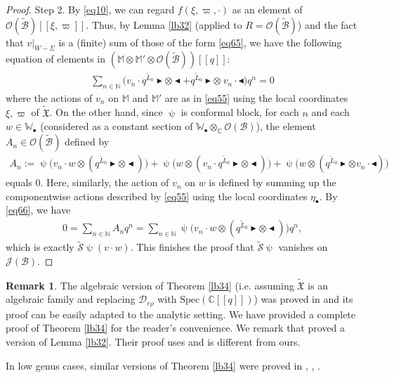 \documentclass[12pt,a4paper,notitlepage]{article}
\theoremstyle{definition}
\newtheorem{rem}[df]{Remark}
\theoremstyle{plain}
\newcommand{\fk}{\mathfrak}
\newcommand{\mc}{\mathcal}
\newcommand{\wtd}{\widetilde}
\newcommand{\scr}{\mathscr}
\newcommand{\blt}{\bullet}
\newcommand{\Wbb}{\mathbb W}
\newcommand{\Mbb}{\mathbb M}
\newcommand{\Cbb}{\mathbb C}
\newcommand{\Nbb}{\mathbb N}
\newcommand{\btl}{\blacktriangleleft}
\newcommand{\btr}{\blacktriangleright}
\numberwithin{equation}{section}
\begin{document}
\begin{proof}
	
	Step 2. By \eqref{eq10}, we can regard $f(\xi,\varpi,\cdot)$ as an element of $\scr O(\wtd{\mc B})[[\xi,\varpi]]$. Thus, by Lemma \ref{lb32} (applied to $R=\scr O(\wtd{\mc B})$) and the fact that $v|_{W-\Sigma}$ is a (finite) sum of those of the form \eqref{eq65}, we have the following equation of elements in $(\Mbb\otimes\Mbb'\otimes \scr O(\wtd{\mc B}))[[q]]$:
	\begin{align}
	\sum_{n\in\Nbb}\big(v_{n}\cdot q^{\wtd L_0}\btr\otimes\btl+ q^{\wtd L_0}\btr\otimes~ v_{n}\cdot\btl\big)q^{n} =0\label{eq66}
	\end{align}
	where the actions of $v_{n}$ on $\Mbb$ and $\Mbb'$ are as in \eqref{eq55} using the  local coordinates $\xi,\varpi$ of $\wtd{\fk X}$. On the other hand, since $\uppsi$ is  conformal block, for each $n$ and each $w\in\Wbb_\blt$ (considered as a constant section of $\Wbb_\blt\otimes_\Cbb\scr O(\mc B)$), the element $A_{n}\in\scr O(\wtd{\mc B})$ defined by
	\begin{align*}
	A_{n}:=\uppsi\big(v_{n}\cdot w\otimes (q^{\wtd L_0}\btr\otimes\btl)\big)+\uppsi\big(w\otimes (v_n\cdot q^{\wtd L_0}\btr\otimes\btl)\big)+\uppsi\big(w\otimes ( q^{\wtd L_0}\btr\otimes v_n\cdot\btl)\big)
	\end{align*}
	equals $0$. Here, similarly, the action of $v_{n}$ on $w$ is defined by summing up the componentwise actions described by \eqref{eq55} using the local coordinates $\eta_\blt$.  By \eqref{eq66}, we have
	\begin{align*}
	0=\sum_{n\in\Nbb}A_{n}q^{n}=\sum_{n\in\Nbb}\uppsi\big(v_{n}\cdot w\otimes (q^{\wtd L_0}\btr\otimes\btl)\big)q^n,
	\end{align*}
	which is exactly $\wtd{\mc S}\uppsi(v\cdot w)$. This finishes the proof that $\wtd{\mc S}\uppsi$ vanishes on $\scr J(\mc B)$.
\end{proof}



\begin{rem}
The algebraic version of  Theorem \ref{lb34} (i.e. assuming $\wtd{\fk X}$ is an algebraic family and replacing $\mc D_{r\rho}$ with $\mathrm{Spec}(\Cbb[[q]])$) was proved in \cite[Thm. 8.5.1]{DGT19b} and its proof can be easily adapted to the analytic setting. We have provided a complete proof of Theorem \ref{lb34} for the reader's convenience. We remark that \cite{DGT19b}  proved a version of Lemma \ref{lb32}. Their proof uses \cite[Lemma 8.7.1]{NT05} and is different from ours.

In low genus cases, similar versions of Theorem \ref{lb34} were proved in \cite[Prop. 4.3.6]{Zhu96}, \cite[Thm. 1.4]{Hua05a}, \cite[Prop. 3.6]{Hua05b}.
\end{rem}
\end{document}
